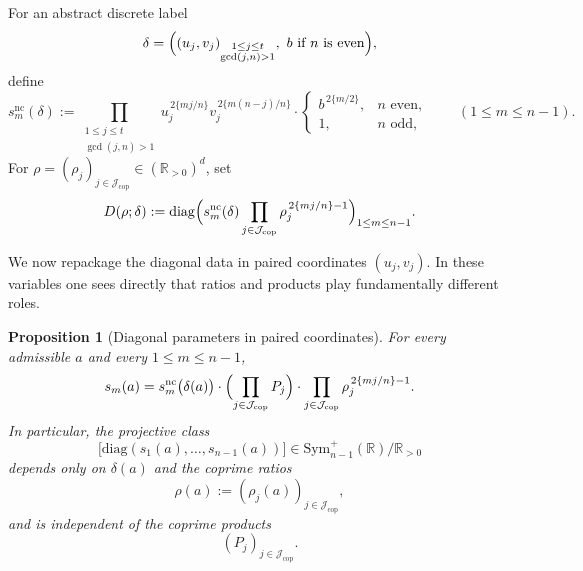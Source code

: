 \documentclass[11pt,letterpaper]{amsart}
\newcommand{\R}{\mathbb{R}}
\newcommand{\Sym}{\mathrm{Sym}}
\newcommand{\diag}{\mathrm{diag}}
\theoremstyle{plain}
\newtheorem{proposition}[theorem]{Proposition}
\theoremstyle{definition}
\begin{document}
For an abstract discrete label
\[
\delta=
\Bigl(
(u_j,v_j)_{\substack{1\le j\le t\\ \gcd(j,n)>1}},
\ b\text{ if }n\text{ is even}
\Bigr),
\]
define
\begin{equation}\label{eq:snc-fixed-leaf}
s_m^{\mathrm{nc}}(\delta)
:=
\prod_{\substack{1\le j\le t\\ \gcd(j,n)>1}}
u_j^{\,2\{mj/n\}}v_j^{\,2\{m(n-j)/n\}}
\cdot
\begin{cases}
b^{\,2\{m/2\}},& n\text{ even},\\
1,& n\text{ odd},
\end{cases}
\qquad (1\le m\le n-1).
\end{equation}
For \(\rho=(\rho_j)_{j\in \mathcal J_{\mathrm{cop}}}\in (\R_{>0})^d\), set
\begin{equation}\label{eq:D-rho-delta-fixed-leaf}
D(\rho;\delta)
:=
\diag\Bigl(
s_m^{\mathrm{nc}}(\delta)
\prod_{j\in \mathcal J_{\mathrm{cop}}}\rho_j^{\,2\{mj/n\}-1}
\Bigr)_{1\le m\le n-1}.
\end{equation}

We now repackage the diagonal data in paired coordinates \((u_j,v_j)\). In these variables one sees directly that ratios and products play fundamentally different roles.


\begin{proposition}[Diagonal parameters in paired coordinates]
\label{prop:diag-paired-fixed-leaf}
For every admissible \(a\) and every \(1\le m\le n-1\),
\begin{equation}\label{eq:s-m-paired-fixed-leaf}
s_m(a)
=
s_m^{\mathrm{nc}}\bigl(\delta(a)\bigr)
\cdot
\Bigl(\prod_{j\in \mathcal J_{\mathrm{cop}}}P_j\Bigr)
\cdot
\prod_{j\in \mathcal J_{\mathrm{cop}}}\rho_j^{\,2\{mj/n\}-1}.
\end{equation}
In particular, the projective class
\[
\bigl[\diag(s_1(a),\dots,s_{n-1}(a))\bigr]
\in \Sym_{n-1}^+(\R)/\R_{>0}
\]
depends only on \(\delta(a)\) and the coprime ratios
\[
\rho(a):=(\rho_j(a))_{j\in \mathcal J_{\mathrm{cop}}},
\]
and is independent of the coprime products
\[
(P_j)_{j\in \mathcal J_{\mathrm{cop}}}.
\]
\end{proposition}
\end{document}
